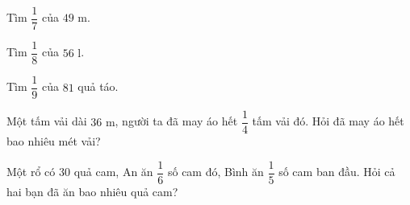 \begin{ex} %
Tìm $\dfrac{1}{7}$ của $49\text{ m}$.
\end{ex}

\begin{ex} %
Tìm $\dfrac{1}{8}$ của $56\text{ l}$.
\end{ex}

\begin{ex} %
Tìm $\dfrac{1}{9}$ của $81$ quả táo.
\end{ex}

\begin{ex} %
Một tấm vải dài $36\text{ m}$, người ta đã may áo hết $\dfrac{1}{4}$ tấm vải đó. Hỏi đã may áo hết bao nhiêu mét vải?
\end{ex}

\begin{ex} %
Một rổ có 30 quả cam, An ăn $\dfrac{1}{6}$ số cam đó, Bình ăn $\dfrac{1}{5}$ số cam ban đầu. Hỏi cả hai bạn đã ăn bao nhiêu quả cam?
\end{ex}
